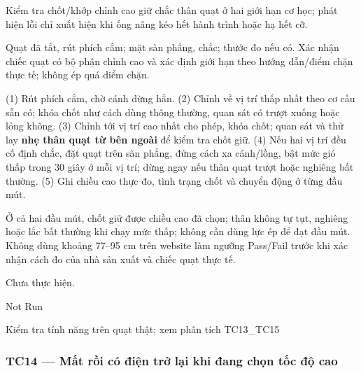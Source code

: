 \begin{description}
\tightlist
\item[Objective]
Kiểm tra chốt/khớp chỉnh cao giữ chắc thân quạt ở hai giới hạn cơ học; phát hiện lỗi chỉ xuất hiện khi ống nâng kéo hết hành trình hoặc hạ hết cỡ.
\item[Input]
Quạt đã tắt, rút phích cắm; mặt sàn phẳng, chắc; thước đo nếu có. Xác nhận chiếc quạt có bộ phận chỉnh cao và xác định giới hạn theo hướng dẫn/điểm chặn thực tế; không ép quá điểm chặn.
\item[Steps]
(1) Rút phích cắm, chờ cánh dừng hẳn. (2) Chỉnh về vị trí thấp nhất theo cơ cấu sẵn có; khóa chốt như cách dùng thông thường, quan sát có trượt xuống hoặc lỏng không. (3) Chỉnh tới vị trí cao nhất cho phép, khóa chốt; quan sát và thử lay \textbf{nhẹ thân quạt từ bên ngoài} để kiểm tra chốt giữ. (4) Nếu hai vị trí đều cố định chắc, đặt quạt trên sàn phẳng, đứng cách xa cánh/lồng, bật mức gió thấp trong 30 giây ở mỗi vị trí; dừng ngay nếu thân quạt trượt hoặc nghiêng bất thường. (5) Ghi chiều cao thực đo, tình trạng chốt và chuyển động ở từng đầu mút.
\item[Expected]
Ở cả hai đầu mút, chốt giữ được chiều cao đã chọn; thân không tự tụt, nghiêng hoặc lắc bất thường khi chạy mức thấp; không cần dùng lực ép để đạt đầu mút. Không dùng khoảng 77--95 cm trên website làm ngưỡng Pass/Fail trước khi xác nhận cách đo của nhà sản xuất và chiếc quạt thực tế.
\item[Actual]
Chưa thực hiện.
\item[Verdict]
Not Run
\item[Ghi chú rà soát]
Kiểm tra tính năng trên quạt thật; xem phân tích TC13\_TC15
\end{description}

\subsubsection{TC14 --- Mất rồi có điện trở lại khi đang chọn tốc độ cao}\label{tc14-mux1ea5t-rux1ed3i-cuxf3-ux111iux1ec7n-trux1edf-lux1ea1i-khi-ux111ang-chux1ecdn-tux1ed1c-ux111ux1ed9-cao}

